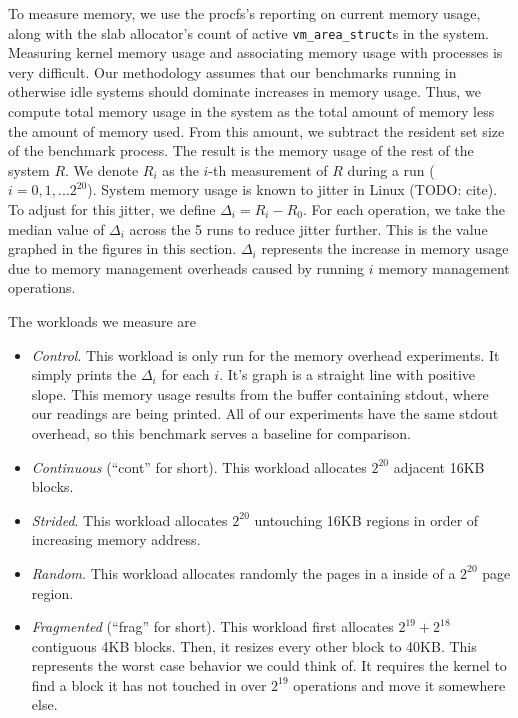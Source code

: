 \documentclass[twocolumn,11pt]{article}
\begin{document}
To measure memory, we use the procfs's reporting on current memory usage, along
with the slab allocator's count of active \texttt{vm\_area\_struct}s in the
system. Measuring kernel memory usage and associating memory usage with
processes is very difficult. Our methodology assumes that our benchmarks running
in otherwise idle systems should dominate increases in memory usage.  Thus, we
compute total memory usage in the system as the total amount of memory less the
amount of memory used. From this amount, we subtract the resident set size of
the benchmark process. The result is the memory usage of the rest of the system
$R$. We denote $R_i$ as the $i$-th measurement of $R$ during a run ($i = 0, 1,
... 2^{20}$). System memory usage is known to jitter in Linux (TODO: cite). To
adjust for this jitter, we define $\Delta_i = R_i - R_0$. For each operation, we
take the median value of $\Delta_i$ across the 5 runs to reduce jitter further.
This is the value graphed in the figures in this section. $\Delta_i$ represents
the increase in memory usage due to memory management overheads caused by
running $i$ memory management operations.

The workloads we measure are

\begin{itemize} \item \textit{Control}. This workload is only run for the memory
overhead experiments. It simply prints the $\Delta_i$ for each $i$. It's graph
is a straight line with positive slope. This memory usage results from the
buffer containing stdout, where our readings are being printed. All of our
experiments have the same stdout overhead, so this benchmark serves a baseline
for comparison.

\item \textit{Continuous} (``cont'' for short). This workload allocates $2^{20}$
adjacent 16KB blocks.

\item \textit{Strided}. This workload allocates $2^{20}$ untouching 16KB regions
in order of increasing memory address.

\item \textit{Random}. This workload allocates randomly the pages in a
inside of a $2^{20}$ page region.

\item \textit{Fragmented} (``frag'' for short). This workload first allocates
$2^{19} + 2^{18}$ contiguous 4KB blocks. Then, it resizes every other block to
40KB. This represents the worst case behavior we could think of. It requires the
kernel to find a block it has not touched in over $2^{19}$ operations and move
it somewhere else.  \end{itemize}
\end{document}
